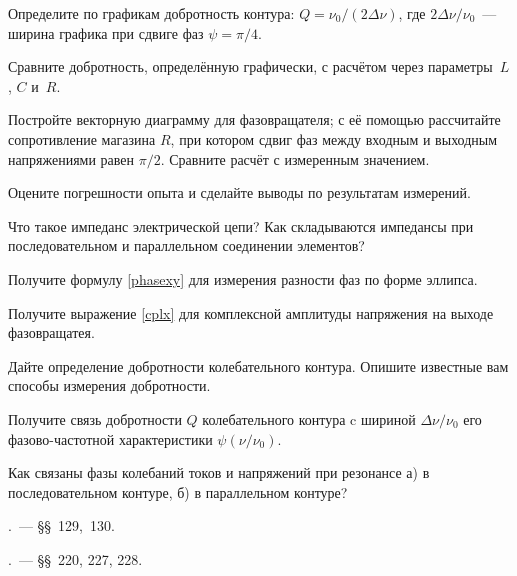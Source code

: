 \begin{lab:task}
Определите по графикам добротность контура: $Q=\nu_0/(2\Delta\nu)$, 
где $2\Delta\nu/\nu_0$~--- ширина графика при сдвиге фаз $\psi=\pi/4$.

\item Сравните добротность, определённую графически, с расчётом 
через параметры~$L$, $C$ и~$R$.

\item Постройте векторную диаграмму для фазовращателя; 
с её помощью рассчитайте сопротивление магазина $R$, при котором 
сдвиг фаз между входным и выходным напряжениями равен $\pi/2$. 
Сравните расчёт с измеренным значением.


\item Оцените погрешности опыта и сделайте выводы по результатам измерений.

\end{lab:task}


\begin{lab:questions}
	\item Что такое импеданс электрической цепи?
	Как складываются импедансы при последовательном и параллельном
соединении элементов?
    \item Получите формулу \eqref{phasexy} для измерения разности 
          фаз по форме эллипса.
    \item Получите выражение \eqref{cplx} для комплексной амплитуды напряжения на
    выходе фазовращатея.
    \item Дайте определение добротности колебательного контура.
    Опишите известные вам способы измерения добротности.
    \item Получите связь добротности $Q$ колебательного контура c шириной
    $\Delta \nu/\nu_0$ его фазово-частотной характеристики $\psi(\nu/\nu_0)$.
    \item Как связаны фазы колебаний токов и напряжений 
    при резонансе а) в последовательном контуре, б) в параллельном контуре?
\end{lab:questions}


\begin{lab:literature}
	\item \SivuhinIII.~--- \S\S~129,~130.
	\item \Kalashnikov.~--- \S\S~220, 227, 228.
\end{lab:literature}
